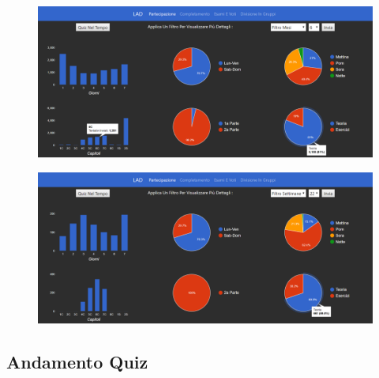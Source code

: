 \begin{figure}[H]
	\centering
	\includegraphics[width=160mm]{../Immagini/4}
\end{figure}

\begin{figure}[H]
	\centering
	\includegraphics[width=160mm]{../Immagini/9}
\end{figure}

\subsection{Andamento Quiz}

